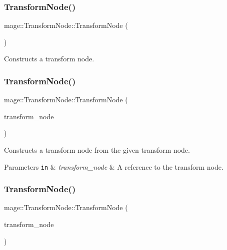 \subsubsection{\texorpdfstring{Transform\+Node()}{TransformNode()}\hspace{0.1cm}{\footnotesize\ttfamily [1/3]}}
{\footnotesize\ttfamily mage\+::\+Transform\+Node\+::\+Transform\+Node (\begin{DoxyParamCaption}{ }\end{DoxyParamCaption})\hspace{0.3cm}{\ttfamily [explicit]}}

Constructs a transform node. \hypertarget{classmage_1_1_transform_node_a6ee41dcccf0aba7f904f1617444411d4}{}\label{classmage_1_1_transform_node_a6ee41dcccf0aba7f904f1617444411d4} 
\subsubsection{\texorpdfstring{Transform\+Node()}{TransformNode()}\hspace{0.1cm}{\footnotesize\ttfamily [2/3]}}
{\footnotesize\ttfamily mage\+::\+Transform\+Node\+::\+Transform\+Node (\begin{DoxyParamCaption}\item[{const \hyperlink{classmage_1_1_transform_node}{Transform\+Node} \&}]{transform\+\_\+node }\end{DoxyParamCaption})}

Constructs a transform node from the given transform node.


\begin{DoxyParams}[1]{Parameters}
\mbox{\tt in}  & {\em transform\+\_\+node} & A reference to the transform node. \\
\hline
\end{DoxyParams}
\hypertarget{classmage_1_1_transform_node_ae9e2e7dafab6af1e4a400fa0b84eff35}{}\label{classmage_1_1_transform_node_ae9e2e7dafab6af1e4a400fa0b84eff35} 
\subsubsection{\texorpdfstring{Transform\+Node()}{TransformNode()}\hspace{0.1cm}{\footnotesize\ttfamily [3/3]}}
{\footnotesize\ttfamily mage\+::\+Transform\+Node\+::\+Transform\+Node (\begin{DoxyParamCaption}\item[{\hyperlink{classmage_1_1_transform_node}{Transform\+Node} \&\&}]{transform\+\_\+node }\end{DoxyParamCaption})}

